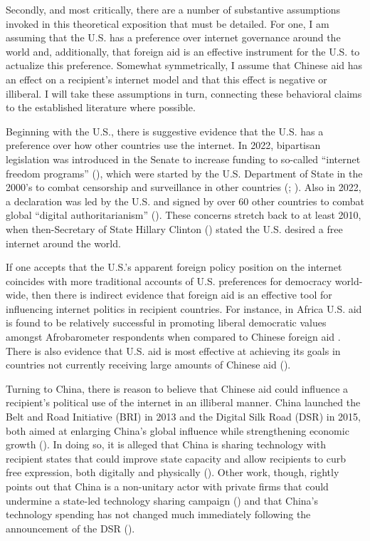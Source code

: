 \documentclass[12pt]{article}
\begin{document}
Secondly, and most critically, there are a number of substantive assumptions invoked in this theoretical exposition that must be detailed. For one, I am assuming that the U.S. has a preference over internet governance around the world and, additionally, that foreign aid is an effective instrument for the U.S. to actualize this preference. Somewhat symmetrically, I assume that Chinese aid has an effect on a recipient's internet model and that this effect is negative or illiberal. I will take these assumptions in turn, connecting these behavioral claims to the established literature where possible.

Beginning with the U.S., there is suggestive evidence that the U.S. has a preference over how other countries use the internet. In 2022, bipartisan legislation was introduced in the Senate to increase funding to so-called ``internet freedom programs'' (\cite{foreignrelationscommittee2022}), which were started by the U.S. Department of State in the 2000's to combat censorship and surveillance in other countries (\cite{u.s.departmentofstate2021}; \cite{hanson2012}). Also in 2022, a declaration was led by the U.S. and signed by over 60 other countries to combat global ``digital authoritarianism'' (\cite{u.s.departmentofstate2022}). These concerns stretch back to at least 2010, when then-Secretary of State Hillary Clinton (\cite{u.s.departmentofstate2010}) stated the U.S. desired a free internet around the world.

If one accepts that the U.S.'s apparent foreign policy position on the internet coincides with more traditional accounts of U.S. preferences for democracy world-wide, then there is indirect evidence that foreign aid is an effective tool for influencing internet politics in recipient countries. For instance, in Africa U.S. aid is found to be relatively successful in promoting liberal democratic values amongst Afrobarometer respondents when compared to Chinese foreign aid \cite{blair2022}. There is also evidence that U.S. aid is most effective at achieving its goals in countries not currently receiving large amounts of Chinese aid (\cite{dreher2021}).

Turning to China, there is reason to believe that Chinese aid could influence a recipient's political use of the internet in an illiberal manner. China launched the Belt and Road Initiative (BRI) in 2013 and the Digital Silk Road (DSR) in 2015, both aimed at enlarging China's global influence while strengthening economic growth (\cite{dreher2022}). In doing so, it is alleged that China is sharing technology with recipient states that could improve state capacity and allow recipients to curb free expression, both digitally and physically (\cite{hillman2021}). Other work, though, rightly points out that China is a non-unitary actor with private firms that could undermine a state-led technology sharing campaign (\cite{shen2018a}) and that China's technology spending has not changed much immediately following the announcement of the DSR (\cite{tugendhat2021}). 
\end{document}
